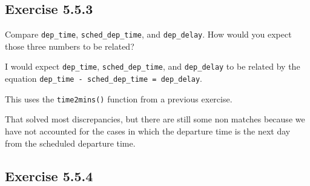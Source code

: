 \documentclass[]{book}
\newenvironment{Shaded}{\begin{snugshade}}{\end{snugshade}}
\newcommand{\CommentTok}[1]{\textcolor[rgb]{0.56,0.35,0.01}{\textit{#1}}}
\newcommand{\DataTypeTok}[1]{\textcolor[rgb]{0.13,0.29,0.53}{#1}}
\newcommand{\KeywordTok}[1]{\textcolor[rgb]{0.13,0.29,0.53}{\textbf{#1}}}
\newcommand{\NormalTok}[1]{#1}
\newcommand{\OperatorTok}[1]{\textcolor[rgb]{0.81,0.36,0.00}{\textbf{#1}}}
\newcommand{\StringTok}[1]{\textcolor[rgb]{0.31,0.60,0.02}{#1}}
\theoremstyle{plain}
\theoremstyle{remark}
\theoremstyle{definition}
\theoremstyle{definition}
\theoremstyle{definition}
\theoremstyle{remark}
\begin{document}
\hypertarget{exercise-5.5.3}{%
\subsection*{\texorpdfstring{Exercise
{5.5.3}}{Exercise 5.5.3}}\label{exercise-5.5.3}}

Compare \texttt{dep\_time}, \texttt{sched\_dep\_time}, and
\texttt{dep\_delay}. How would you expect those three numbers to be
related?

I would expect \texttt{dep\_time}, \texttt{sched\_dep\_time}, and
\texttt{dep\_delay} to be related by the equation
\texttt{dep\_time\ -\ sched\_dep\_time\ =\ dep\_delay}.

\begin{Shaded}
\end{Shaded}

This uses the \texttt{time2mins()} function from a previous exercise.

That solved most discrepancies, but there are still some non matches
because we have not accounted for the cases in which the departure time
is the next day from the scheduled departure time.

\hypertarget{exercise-5.5.4}{%
\subsection*{\texorpdfstring{Exercise
{5.5.4}}{Exercise 5.5.4}}\label{exercise-5.5.4}}
\end{document}
